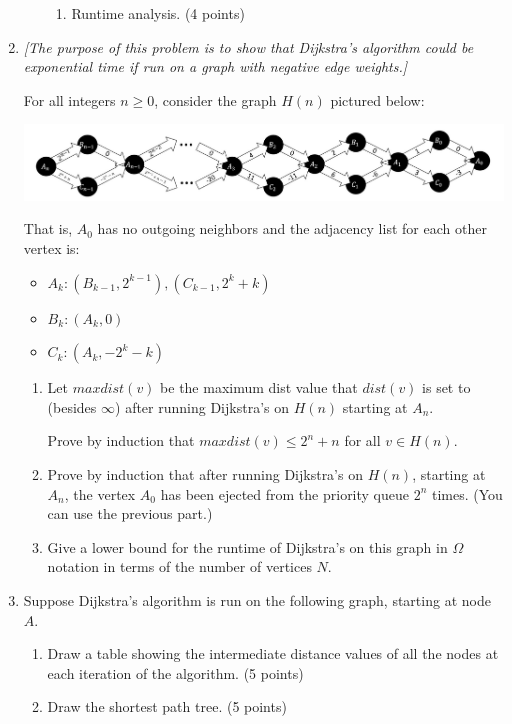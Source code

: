 \documentclass[10pt,letterpaper,unboxed,cm]{article}
\begin{document}
\begin{enumerate}
\begin{enumerate}
\begin{enumerate}
\item
Runtime analysis. (4 points)



\end{enumerate}
\end{enumerate}

\item
\emph{[The purpose of this problem is to show that Dijkstra's algorithm could be exponential time if run on a graph with negative edge weights.]}

For all integers $n\geq 0$, consider the graph $H(n)$ pictured below:

\includegraphics[scale=0.4]{Dijkstra_negative}

That is, $A_0$ has no outgoing neighbors and the adjacency list for each other vertex is:

\begin{itemize}
\item
$A_k: (B_{k-1},2^{k-1}),(C_{k-1},2^k + k)$
\item
$B_k: (A_{k},0)$
\item
$C_k: (A_{k}, -2^k - k)$ 
\end{itemize}

\begin{enumerate}
\item
Let $maxdist(v)$ be the maximum dist value that $dist(v)$ is set to (besides $\infty$) after running Dijkstra's on $H(n)$ starting at $A_n$.

Prove by induction that $maxdist(v)\leq 2^n+n$ for all $v\in H(n)$.

\item
Prove by induction that after running Dijkstra's on $H(n)$, starting at $A_n$, the vertex $A_0$ has been ejected from the priority queue $2^n$ times. (You can use the previous part.)

\item
Give a lower bound for the runtime of Dijkstra's on this graph in $\Omega$ notation in terms of the number of vertices $N$.
\end{enumerate}

\item
Suppose Dijkstra's algorithm is run on the following graph, starting at node $A$.
\begin{enumerate}
\item
Draw a table showing the intermediate distance values of all the nodes at each iteration of the algorithm. (5 points)
\item
Draw the shortest path tree.
(5 points)


\end{enumerate}
\end{enumerate}
\end{document}
